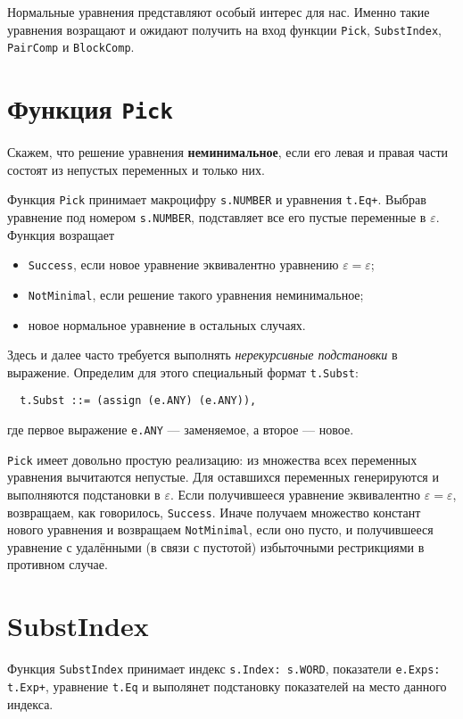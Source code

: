 \documentclass[12pt]{article}
\begin{document}
Нормальные уравнения представляют особый интерес для нас. Именно такие уравнения
возращают и ожидают получить на вход функции \texttt{Pick}, \texttt{SubstIndex},
\texttt{PairComp} и \texttt{BlockComp}.

\section{Функция \texttt{Pick}}

Скажем, что решение уравнения \textbf{неминимальное}, если его левая и правая
части состоят из непустых переменных и только них.

Функция \texttt{Pick} принимает макроцифру \texttt{s.NUMBER} и уравнения
\texttt{t.Eq+}. Выбрав уравнение под номером \texttt{s.NUMBER}, подставляет
все его пустые переменные в $\varepsilon$. Функция возращает
\begin{itemize}
  \item \texttt{Success}, если новое уравнение эквивалентно уравнению
  $\varepsilon = \varepsilon$;
\item \texttt{NotMinimal}, если решение такого уравнения неминимальное;
\item новое нормальное уравнение в остальных случаях.
\end{itemize}

Здесь и далее часто требуется выполнять \textit{нерекурсивные подстановки} в
выражение. Определим для этого специальный формат \texttt{t.Subst}:
\begin{Verbatim}
  t.Subst ::= (assign (e.ANY) (e.ANY)),
\end{Verbatim}
где первое выражение \texttt{e.ANY} --- заменяемое, а второе --- новое.

\texttt{Pick} имеет довольно простую реализацию: из множества всех переменных
уравнения вычитаются непустые. Для оставшихся переменных генерируются
и выполняются подстановки в $\varepsilon$. Если получившееся уравнение
эквивалентно $\varepsilon = \varepsilon$, возвращаем, как говорилось,
\texttt{Success}. Иначе получаем множество констант нового уравнения и
возвращаем \texttt{NotMinimal}, если оно пусто, и получившееся уравнение с
удалёнными (в связи с пустотой) избыточными рестрикциями в противном случае.

\section{SubstIndex}

Функция \texttt{SubstIndex} принимает индекс \texttt{s.Index: s.WORD},
показатели \texttt{e.Exps: t.Exp+}, уравнение \texttt{t.Eq} и выполянет
подстановку показателей на место данного индекса.
\end{document}

